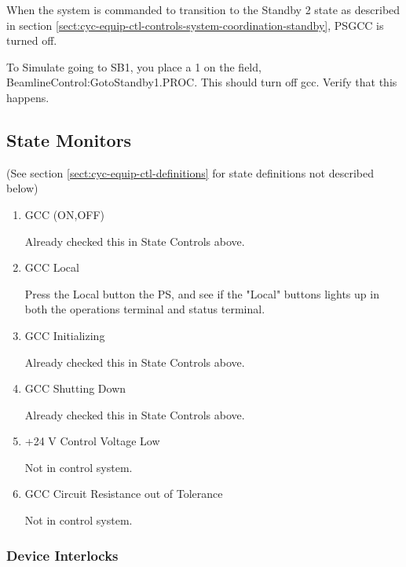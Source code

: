 \documentclass[11pt]{book}		%
\begin{document}
When the system is commanded to transition to the Standby 2 state as described in section \ref{sect:cyc-equip-ctl-controls-system-coordination-standby}, PSGCC is turned off.

\color{red}

To Simulate going to SB1, you place a 1 on the field, BeamlineControl:GotoStandby1.PROC. This should turn off gcc.  Verify that this happens.

\color{black}


\subsection{State Monitors} \label{sect:cyc-equip-ctl-beamline-gcc-state-monitors}
(See section \ref{sect:cyc-equip-ctl-definitions} for state definitions not described below)

\begin{enumerate}
 \item GCC (ON,OFF)

\color{red}
Already checked this in State Controls above.
\color{black}

 \item GCC Local

\color{red}
Press the Local button the PS, and see if the "Local" buttons lights up in both the operations terminal and status terminal.
\color{black}

 \item GCC Initializing

\color{red}
Already checked this in State Controls above.
\color{black}

 \item GCC Shutting Down

\color{red}
Already checked this in State Controls above.
\color{black}

 \item +24 V Control Voltage Low

\color{red}
Not in control system.
\color{black}

 \item GCC Circuit Resistance out of Tolerance

\color{red}
Not in control system.
\color{black}

\end{enumerate}

\subsubsection{Device Interlocks}
\end{document}
